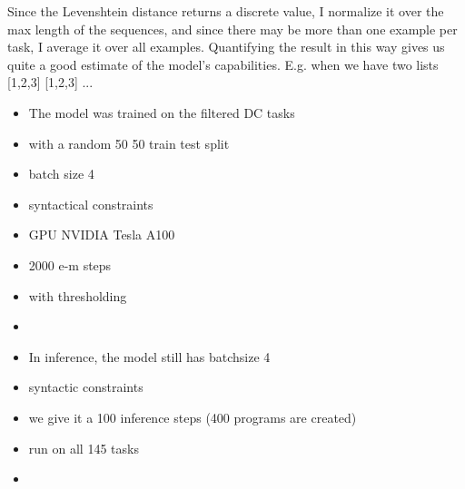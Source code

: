 Since the Levenshtein distance returns a discrete value, I normalize it over the max length of the sequences, and since there may be more than one example per task, I average it over all examples.
Quantifying the result in this way gives us quite a good estimate of the model's capabilities. E.g. when we have two lists [1,2,3] [1,2,3] ...

















































\begin{itemize}
    \item The model was trained on the filtered DC tasks 
    \item with a random 50 50 train test split
    \item batch size 4
    \item syntactical constraints
    \item GPU NVIDIA Tesla A100
    \item 2000 e-m steps 
    \item with thresholding
    \item 
\end{itemize} 

\begin{itemize}
    \item In inference, the model still has batchsize 4
    \item syntactic constraints
    \item we give it a 100 inference steps (400 programs are created)
    \item run on all 145 tasks
    \item 
\end{itemize}











